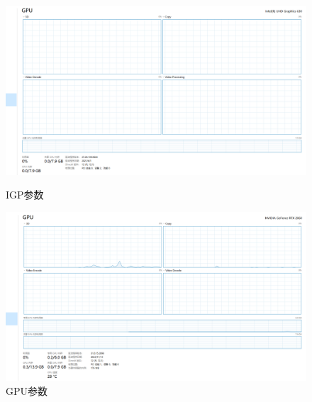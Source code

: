 \begin{figure}[htbp]
	\centering
	\begin{minipage}[t]{0.48\textwidth}
		\centering
		\includegraphics[width=1\textwidth]{figures/device_para/igp.png}
		\caption{IGP参数}
		\label{fig:igppara}
	\end{minipage}
	\begin{minipage}[t]{0.48\textwidth}
		\centering
		\includegraphics[width=1\textwidth]{figures/device_para/gpu.png}
		\caption{GPU参数}
		\label{fig:gpupara}
	\end{minipage}
\end{figure}

